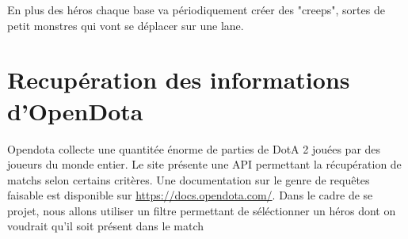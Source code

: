 \documentclass{article}
\begin{document}
En plus des héros chaque base va périodiquement créer des "creeps", sortes de petit monstres qui vont se déplacer sur une lane.

\section{Recupération des informations d'OpenDota}

Opendota collecte une quantitée énorme de parties de DotA 2 jouées par des joueurs du monde entier. Le site présente une API permettant la récupération de matchs selon certains critères. Une documentation sur le genre de requêtes faisable est disponible sur \url{https://docs.opendota.com/}. Dans le cadre de se projet, nous allons utiliser un filtre permettant de séléctionner un héros dont on voudrait qu'il soit présent dans le match
\end{document}
